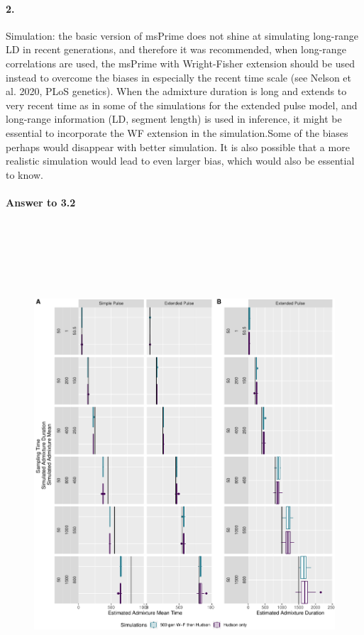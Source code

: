 \documentclass[11pt]{article}
\let\oldparagraph\paragraph
\renewcommand{\paragraph}[1]{\oldparagraph{#1}\mbox{}}
\begin{document}
\paragraph{2.}
Simulation: the basic version of msPrime does not shine at simulating long-range LD in recent generations, and therefore it was recommended, when long-range correlations are used, the msPrime with Wright-Fisher extension should be used instead to overcome the biases in especially the recent time scale (see Nelson et al. 2020, PLoS genetics). When the admixture duration is long and extends to very recent time as in some of the simulations for the extended pulse model, and long-range information (LD, segment length) is used in inference, it might be essential to incorporate the WF extension in the simulation.Some of the biases perhaps would disappear with better simulation. It is also possible that a more realistic simulation would lead to even larger bias, which would also be essential to know.

\paragraph{Answer to 3.2}

\begin{figure}
\centering
\includegraphics[width=16cm,height=18cm,keepaspectratio]{ATE_Revisions_files/figure-latex/figR4-1.pdf}
\caption{\label{fig:fig_R} }
\end{figure}
\end{document}
